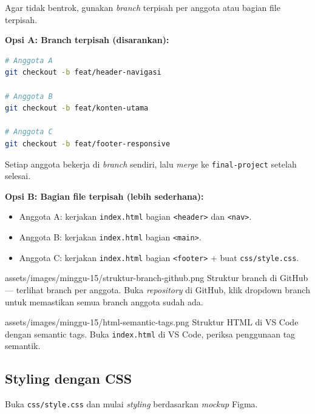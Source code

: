 Agar tidak bentrok, gunakan \emph{branch} terpisah per anggota atau bagian file terpisah.

\textbf{Opsi A: Branch terpisah (disarankan):}
\begin{lstlisting}[language=bash, caption={Branch per anggota}]
# Anggota A
git checkout -b feat/header-navigasi

# Anggota B
git checkout -b feat/konten-utama

# Anggota C
git checkout -b feat/footer-responsive
\end{lstlisting}

Setiap anggota bekerja di \emph{branch} sendiri, lalu \emph{merge} ke \texttt{final-project} setelah selesai.

\textbf{Opsi B: Bagian file terpisah (lebih sederhana):}
\begin{itemize}
  \item Anggota A: kerjakan \texttt{index.html} bagian \texttt{<header>} dan \texttt{<nav>}.
  \item Anggota B: kerjakan \texttt{index.html} bagian \texttt{<main>}.
  \item Anggota C: kerjakan \texttt{index.html} bagian \texttt{<footer>} + buat \texttt{css/style.css}.
\end{itemize}

\begin{tangkapanlayar}
  {assets/images/minggu-15/struktur-branch-github.png}
  {Struktur branch di GitHub --- terlihat branch per anggota.}
  {Buka \emph{repository} di GitHub, klik dropdown branch untuk memastikan semua branch anggota sudah ada.}
\end{tangkapanlayar}

\begin{tangkapanlayar}
  {assets/images/minggu-15/html-semantic-tags.png}
  {Struktur HTML di VS Code dengan semantic tags.}
  {Buka \texttt{index.html} di VS Code, periksa penggunaan tag semantik.}
\end{tangkapanlayar}

\subsection{Styling dengan CSS}
\label{subsec:css-styling}

Buka \texttt{css/style.css} dan mulai \emph{styling} berdasarkan \emph{mockup} Figma.


